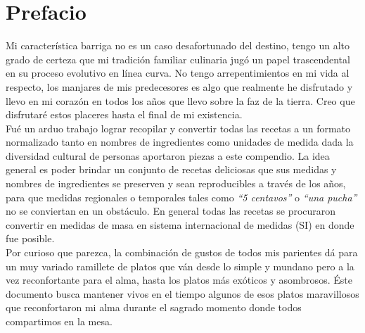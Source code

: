 \chapter{Prefacio}
Mi característica barriga no es un caso desafortunado del destino, tengo un alto grado de certeza que mi tradición familiar culinaria jugó un papel trascendental en su proceso evolutivo en línea curva. No tengo arrepentimientos en mi vida al respecto, los manjares de mis predecesores es algo que realmente he disfrutado y llevo en mi corazón en todos los años que llevo sobre la faz de la tierra. Creo que disfrutaré estos placeres hasta el final de mi existencia.\\

Fué un arduo trabajo lograr recopilar y convertir todas las recetas a un formato normalizado tanto en nombres de ingredientes como unidades de medida dada la diversidad cultural de personas aportaron piezas a este compendio. La idea general es poder brindar un conjunto de recetas deliciosas que sus medidas y nombres de ingredientes se preserven y sean reproducibles a través de los años, para que medidas regionales o temporales tales como \emph{``5 centavos''} o \emph{``una pucha''} no se conviertan en un obstáculo. En general todas las recetas se procuraron convertir en medidas de masa en sistema internacional de medidas (SI) en donde fue posible.\\

Por curioso que parezca, la combinación de gustos de todos mis parientes dá para un muy variado ramillete de platos que ván desde lo simple y mundano pero a la vez reconfortante para el alma, hasta los platos más exóticos y asombrosos. Éste documento busca mantener vivos en el tiempo algunos de esos platos maravillosos que reconfortaron mi alma durante el sagrado momento donde todos compartimos en la mesa.

